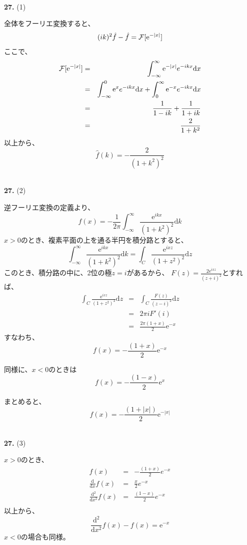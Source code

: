 \documentclass{jarticle}
\newcommand{\diff}{\mathrm d}
\newcommand{\ans}[2]{\noindent\\ {\bf \large #1.} (#2)}
\newcommand{\e}{\mathrm e}
\begin{document}
\ans{27}{1}

全体をフーリエ変換すると、
\begin{equation}
  (ik)^2 \hat{f} - \hat{f} = {\cal F}[\e^{-|x|}]
\end{equation}
ここで、
\begin{eqnarray}
  {\cal F}[\e^{-|x|}] & =&
  \int_{-\infty}^{\infty} \e^{-|x|} e^{-ikx} \diff x\\
  &=&
  \int_{-\infty}^{0} \e^{x} e^{-ikx} \diff x +
  \int_{0}^{\infty} \e^{-x} e^{-ikx} \diff x \\
  &=& \frac{1}{1-ik} + \frac{1}{1+ik}\\
  &=& \frac{2}{1+k^2}
\end{eqnarray}
以上から、
\begin{equation}
  \hat{f}(k) = - \frac{2}{(1+k^2)^2}
\end{equation}

\ans{27}{2}

逆フーリエ変換の定義より、
\begin{equation}
  f(x) = - \frac{1}{2\pi} \int_{-\infty}^{\infty}  \frac{\e^{ikx}}{(1+k^2)^2} \diff k
\end{equation}
$x>0$のとき、複素平面の上を通る半円を積分路とすると、
\begin{equation}
  \int_{-\infty}^{\infty}  \frac{\e^{ikx}}{(1+k^2)^2} \diff k
  = \int_C  \frac{\e^{ixz}}{(1+z^2)^2} \diff z
\end{equation}
このとき、積分路の中に、2位の極$z = i$があるから、
$F(z) = \displaystyle \frac{2 \e^{ixz}}{(z+i)^2}$とすれば、
\begin{eqnarray}
  \int_C  \frac{\e^{ixz}}{(1+z^2)^2} \diff z &=& \int_C  \frac{F(z)}{(z-i)^2} \diff z \\
  &=& 2 \pi i F'(i) \\
  &=& \frac{2\pi (1+x)}{2} \e^{-x}
\end{eqnarray}
すなわち、
\begin{equation}
  f(x) = - \frac{(1+x)}{2} \e^{-x}
\end{equation}

同様に、$x<0$のときは
\begin{equation}
  f(x) = - \frac{(1-x)}{2} \e^{x}
\end{equation}

まとめると、
\begin{equation}
  f(x) = - \frac{(1+|x|)}{2} \e^{-|x|}
\end{equation}

\ans{27}{3}

$x>0$のとき、
\begin{eqnarray}
  f(x) &=& -\frac{(1+x)}{2}e^{-x}\\
  \frac{\diff}{\diff x} f(x) &=& \frac{x}{2}e^{-x}\\
  \frac{\diff^2}{\diff x^2}  f(x) &=& \frac{(1-x)}{2}e^{-x}\\
\end{eqnarray}
以上から、
\begin{equation}
  \frac{\diff^2}{\diff x^2}  f(x) - f(x) = \e^{-x}
\end{equation}
$x<0$の場合も同様。
\end{document}
